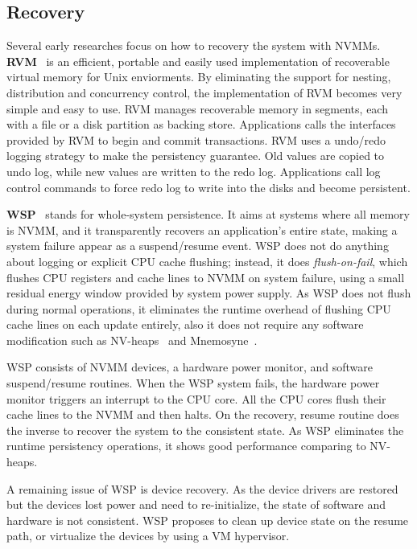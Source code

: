 \subsection{Recovery} 
\label{sec:recovery}

Several early researches focus on how to recovery the system with NVMMs.
\textbf{RVM}~\cite{RVM} is an efficient,
 portable and easily used implementation of
recoverable virtual memory for Unix enviorments. By eliminating the support
for nesting, distribution and concurrency control, the implementation of 
RVM becomes very simple and easy to use. RVM manages recoverable memory in
segments, each with a file or a disk partition as backing store. Applications
calls the interfaces provided by RVM to begin and commit transactions. RVM
uses a undo/redo logging strategy to make the persistency guarantee. Old values
are copied to undo log, while new values are written to the redo log. Applications call log control commands to force redo log to write into the disks
and become persistent.

\textbf{WSP}~\cite{WSP} stands for whole-system persistence.
 It aims at systems where
all memory is NVMM, and it transparently recovers an application's entire state,
making a system failure appear as a suspend/resume event. WSP does not
do anything about logging or explicit CPU cache flushing; instead, it does 
\emph{flush-on-fail}, which flushes CPU registers and cache lines to NVMM
on system failure, using a small residual energy window provided by system
power supply. As WSP does not flush during normal operations, it eliminates
the runtime overhead of flushing CPU cache lines on each update entirely, also
it does not require any software modification such as NV-heaps~\cite{nvheaps}
 and Mnemosyne~\cite{mnemosyne}.

WSP consists of NVMM devices, a hardware power monitor, and software suspend/resume routines. When the WSP system fails, the hardware power monitor triggers
an interrupt to the CPU core. All the CPU cores flush their cache lines to the 
NVMM and then halts. On the recovery, resume routine does the inverse to recover
the system to the consistent state. As WSP eliminates the runtime persistency
operations, it shows good performance comparing to NV-heaps.

A remaining issue of WSP is device recovery. As the device drivers are restored
but the devices lost power and need to re-initialize, the state of software
and hardware is not consistent. WSP proposes to clean up device state on
the resume path, or virtualize the devices by using a VM hypervisor.


